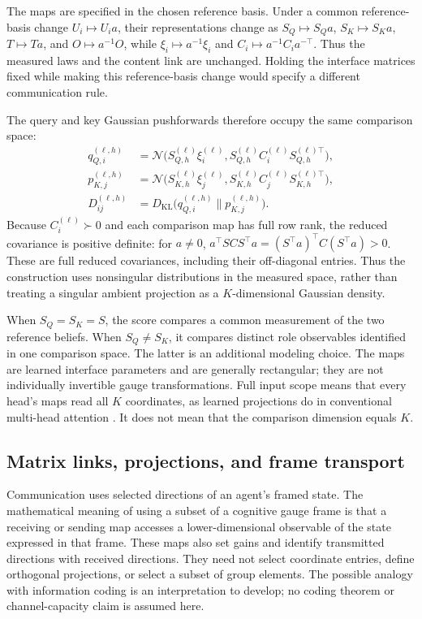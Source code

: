 \documentclass[twoside,11pt]{article}
\begin{document}
The maps are specified in the chosen reference basis. Under a common reference-basis change \(U_i\mapsto U_i a\), their representations change as \(S_Q\mapsto S_Qa\), \(S_K\mapsto S_Ka\), \(T\mapsto Ta\), and \(O\mapsto a^{-1}O\), while \(\xi_i\mapsto a^{-1}\xi_i\) and \(C_i\mapsto a^{-1}C_i a^{-\top}\). Thus the measured laws and the content link are unchanged. Holding the interface matrices fixed while making this reference-basis change would specify a different communication rule.

The query and key Gaussian pushforwards therefore occupy the same comparison space:
\begin{align}
q_{Q,i}^{(\ell,h)}
&=\mathcal N\bigl(S_{Q,h}^{(\ell)}\xi_i^{(\ell)},
 S_{Q,h}^{(\ell)}C_i^{(\ell)}S_{Q,h}^{(\ell)\top}\bigr),\\
p_{K,j}^{(\ell,h)}
&=\mathcal N\bigl(S_{K,h}^{(\ell)}\xi_j^{(\ell)},
 S_{K,h}^{(\ell)}C_j^{(\ell)}S_{K,h}^{(\ell)\top}\bigr),\\
D_{ij}^{(\ell,h)}
&=D_{\mathrm{KL}}\bigl(q_{Q,i}^{(\ell,h)}\|p_{K,j}^{(\ell,h)}\bigr).
\label{eq:relational_role_kl}
\end{align}
Because $C_i^{(\ell)}\succ0$ and each comparison map has full row rank, the reduced covariance is positive definite: for $a\ne0$, $a^\top SCS^\top a=(S^\top a)^\top C(S^\top a)>0$. These are full reduced covariances, including their off-diagonal entries. Thus the construction uses nonsingular distributions in the measured space, rather than treating a singular ambient projection as a $K$-dimensional Gaussian density.

When $S_Q=S_K=S$, the score compares a common measurement of the two reference beliefs. When $S_Q\ne S_K$, it compares distinct role observables identified in one comparison space. The latter is an additional modeling choice. The maps are learned interface parameters and are generally rectangular; they are not individually invertible gauge transformations. Full input scope means that every head's maps read all $K$ coordinates, as learned projections do in conventional multi-head attention \citep{vaswani2017attention}. It does not mean that the comparison dimension equals $K$.


\subsection{Matrix links, projections, and frame transport}
\label{sec:projection_link_geometry}
\label{sec:matrix_link_fields}

Communication uses selected directions of an agent's framed state. The mathematical meaning of using a subset of a cognitive gauge frame is that a receiving or sending map accesses a lower-dimensional observable of the state expressed in that frame. These maps also set gains and identify transmitted directions with received directions. They need not select coordinate entries, define orthogonal projections, or select a subset of group elements. The possible analogy with information coding is an interpretation to develop; no coding theorem or channel-capacity claim is assumed here.
\end{document}
